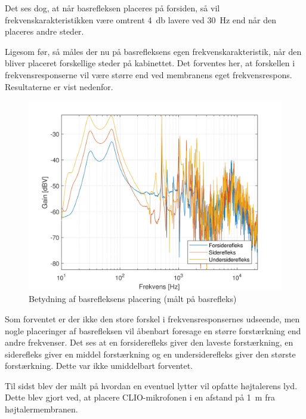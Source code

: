 Det ses dog, at når basrefleksen placeres på forsiden, så vil frekvenskarakteristikken være omtrent \SI{4}{\decibel} lavere ved \SI{30}{\hertz} end når den placeres andre steder.

\newpage
Ligesom før, så måles der nu på basrefleksens egen frekvenskarakteristik, når den bliver placeret forskellige steder på kabinettet. Det forventes her, at forskellen i frekvensresponserne vil være større end ved membranens eget frekvensrespons. Resultaterne er vist nedenfor.
\begin{figure}[H]
	\centering
	\vspace{-12pt}
	\includegraphics[width=\textwidth]{Billeder/Grafer/BasrefleksPlacementTube}
	\caption{Betydning af basrefleksens placering (målt på basrefleks)}
\end{figure}

Som forventet er der ikke den store forskel i frekvensresponsernes udseende, men nogle placeringer af basrefleksen vil åbenbart foresage en større forstærkning end andre frekvenser. Det ses at en forsiderefleks giver den laveste forstærkning, en siderefleks giver en middel forstærkning og en undersiderefleks giver den største forstærkning. Dette var ikke umiddelbart forventet.

\newpage
Til sidst blev der målt på hvordan en eventuel lytter vil opfatte højtalerens lyd. Dette blev gjort ved, at placere CLIO-mikrofonen i en afstand på \SI{1}{\meter} fra højtalermembranen.

